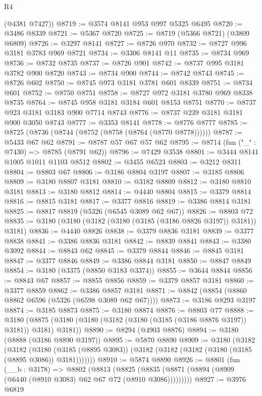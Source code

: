 \begin{lexlean}{R4}
\begin{coremodule}
      (@4381 @7427))
@8719 := @3574 @8141 @953 @997 @5325 @6495
@8720 := @3486 @8339
@8721 := @5367 @8720
@8725 := @8719 (@5366 @8721) (@3809 @6809)
@8726 := @3297 @8141
@8727 := @8726 @970
@8732 := @8727 @996 @3181 @3783 @969 @8721
@8734 := @3306 @8141 @11
@8735 := @8734 @969
@8736 := @8732 @8735
@8737 := @8726 @901
@8742 := @8737 @995 @3181 @3782 @900 @8720
@8743 := @8734 @900
@8744 := @8742 @8743
@8745 := @8726 @602
@8750 := @8745 @973 @3181 @3781 @601 @8339
@8751 := @8734 @601
@8752 := @8750 @8751
@8758 := @8727 @972 @3181 @3780 @969 @8338 @8735
@8764 := @8745 @958 @3181 @3184 @601 @8153 @8751
@8770 := @8737 @923 @3181 @3183 @900 @7714 @8743
@8776 := @8737 @239 @3181 @3181 @900 @3050 @8743
@8777 := @3353 @8141
@8778 := @8776 @8777
@8785 := @8725 (@8736 (@8744 (@8752 (@8758 (@8764 (@8770 @8778))))))
@8787 := @5433 @67 @62
@8791 := @8787 @57 @67 @57 @62
@8795 := @8714 (fun ("_" : @7430) => @8785 (@8791 @62))
@8796 := @7429 @3538
@8801 := @3444 @8141 @1005 @1011 @1103 @8512
@8802 := @3455 @6523
@8803 := @3212 @8311
@8804 := @8803 @67
@8806 := @3186 @8804 @3197
@8807 := @3185 @8806
@8809 := @3180 @8807 @3181
@8810 := @3182 @8809
@8812 := @3180 @8810 @3181
@8813 := @3180 @8812
@8814 := @4440 @8804
@8815 := @3379 @8814
@8816 := @8815 @3181
@8817 := @3377 @8816
@8819 := @3386 @8814 @3181
@8825 := @8817 @8819 (@5326 (@6545 @3089 @62 @67))
@8826 := @8803 @72
@8835 := @3180 (@3180 (@3182 (@3180 (@3185 (@3186 @8826 @3197)) @3181)) @3181)
@8836 := @4440 @8826
@8838 := @3379 @8836 @3181
@8839 := @3377 @8838
@8841 := @3386 @8836 @3181
@8842 := @8839 @8841
@8843 := @3380 @3092
@8844 := @8843 @62
@8845 := @3379 @8844
@8846 := @8845 @3181
@8847 := @3377 @8846
@8849 := @3386 @8844 @3181
@8850 := @8847 @8849
@8854 := @3180 (@3375 (@8850 @3183 @3374))
@8855 := @3644 @8844
@8856 := @8843 @67
@8857 := @8855 @8856
@8859 := @3379 @8857 @3181
@8860 := @3377 @8859
@8862 := @3386 @8857 @3181
@8871 := @8842 (@8854 (@8860 @8862 @6596 (@5326 (@6598 @3089 @62 @67))))
@8873 := @3186 @8293 @3197
@8874 := @3185 @8873
@8875 := @3180 @8874
@8876 := @8803 @77
@8888 := @3180 (@8875 (@3180 (@3180 (@3182 (@3180 (@3185 (@3186 @8876 @3197)) @3181)) @3181) @3181))
@8890 := @8294 (@4903 @8876)
@8894 := @3180 (@8888 (@3186 @8890 @3197))
@8895 := @5870 @8890
@8909 := @3180
    (@3182
      (@3182
        (@3180 (@3185 (@8895 @3083)) (@3182 (@3182 (@3182 (@3180 (@3185 (@8895 @3086)) @3181)))))))
@8910 := @5874 @8890
@8926 := @8801
    (fun (__b : @3178) =>
    @8802
      (@8813
        (@8825 (@8835 (@8871 (@8894 (@8909 (@6440 (@8910 @3083) @62 @67 @72 (@8910 @3086)))))))))
@8927 := @3976 @6819

\end{coremodule}
\end{lexlean}
